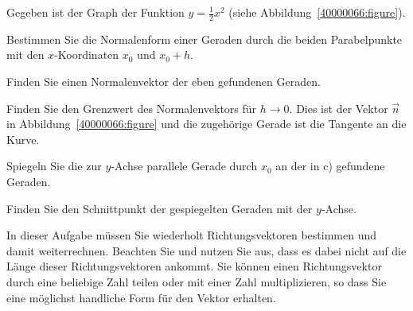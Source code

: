 Gegeben ist der Graph der Funktion $y=\frac12x^2$ (siehe
Abbildung~\ref{40000066:figure}).
\begin{teilaufgaben}
\item
Bestimmen Sie die Normalenform einer Geraden durch die beiden
Parabelpunkte mit den $x$-Koordinaten $x_0$ und $x_0+h$.
\item
Finden Sie einen Normalenvektor der eben gefundenen Geraden.
\item
Finden Sie den Grenzwert des Normalenvektors für $h\to 0$.
Dies ist der Vektor $\vec n$ in Abbildung~\ref{40000066:figure}
und die zugehörige Gerade ist die Tangente an die Kurve.
\item
Spiegeln Sie die zur $y$-Achse parallele Gerade durch $x_0$ an der in
c) gefundene Geraden.
\item
Finden Sie den Schnittpunkt der gespiegelten Geraden mit der $y$-Achse.
\end{teilaufgaben}

\begin{hinweis}
In dieser Aufgabe müssen Sie wiederholt Richtungsvektoren bestimmen und damit
weiterrechnen.
Beachten Sie und nutzen Sie aus, dass es dabei nicht auf die Länge dieser
Richtungsvektoren ankommt.
Sie können einen Richtungsvektor durch eine beliebige Zahl teilen oder
mit einer Zahl multiplizieren, so dass Sie eine möglichst handliche
Form für den Vektor erhalten.
\end{hinweis}

